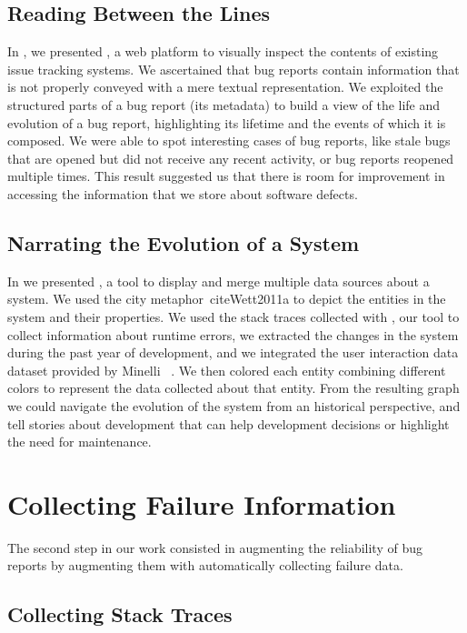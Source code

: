 \subsection{Reading Between the Lines}

In , we presented \ib, a web platform to visually inspect the contents of existing issue tracking systems.
We ascertained that bug reports contain information that is not properly conveyed with a mere textual representation.
We exploited the structured parts of a bug report (\eg its metadata) to build a view of the life and evolution of a bug report, highlighting its lifetime and the events of which it is composed.
We were able to spot interesting cases of bug reports, like stale bugs that are opened but did not receive any recent activity, or bug reports reopened multiple times.
This result suggested us that there is room for improvement in accessing the information that we store about software defects.



\subsection{Narrating the Evolution of a System}

In  we presented , a tool to display and merge multiple data sources about a system.
We used the city metaphor~cite{Wett2011a} to depict the entities in the \pha system and their properties.
We used the stack traces collected with \sln, our tool to collect information about runtime errors, we extracted the changes in the \pha system during the past year of development, and we integrated the user interaction data dataset provided by Minelli \etal~\cite{Mine2017a}.
We then colored each entity combining different colors to represent the data collected about that entity.
From the resulting graph we could navigate the evolution of the system from an historical perspective, and tell stories about development that can help development decisions or highlight the need for maintenance.


\section{Collecting Failure Information}

The second step in our work consisted in augmenting the reliability of bug reports by augmenting them with automatically collecting failure data.

\subsection{Collecting Stack Traces}

